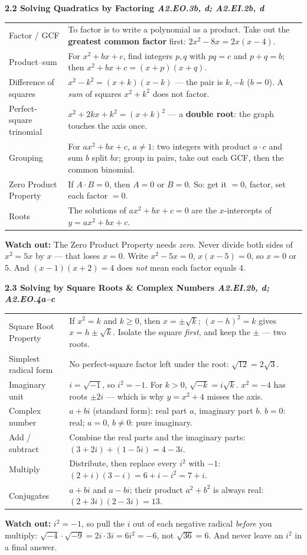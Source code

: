 \documentclass[10pt]{article}
\newcommand{\sghead}[2]{%
  \boxguard[10]%
  \vspace{4pt}\par\noindent
  \colorbox{forest}{\parbox{\dimexpr\linewidth-2\fboxsep}{%
    \small\color{white}\bfseries #1 \hfill \textmd{\itshape\scriptsize\color{forestmid} #2}}}%
  \vspace{2pt}\par}
\newcommand{\sgwatch}[1]{%
  \vspace{1pt}\par\noindent
  \colorbox{redbg}{\parbox{\dimexpr\linewidth-2\fboxsep}{%
    \footnotesize\textbf{\textcolor{redacc}{Watch out:}} #1}}%
  \vspace{1pt}\par}
\newcommand{\sgtabsetup}{\renewcommand{\arraystretch}{1.06}\footnotesize}
\begin{document}
\sghead{2.2 \quad Solving Quadratics by Factoring}{A2.EO.3b, d; A2.EI.2b, d}
{\sgtabsetup
\begin{tabularx}{\linewidth}{@{} G X @{}}
Factor / GCF & To factor is to write a polynomial as a product. Take out the \textbf{greatest
  common factor} first: $2x^2-8x=2x(x-4)$. \\
Product--sum & For $x^2+bx+c$, find integers $p,q$ with $pq=c$ and $p+q=b$; then
  $x^2+bx+c=(x+p)(x+q)$. \\
Difference of squares & $x^2-k^2=(x+k)(x-k)$ --- the pair is $k,-k$ ($b=0$). A \emph{sum} of
  squares $x^2+k^2$ does not factor. \\
Perfect-square trinomial & $x^2+2kx+k^2=(x+k)^2$ --- a \textbf{double root}: the graph touches
  the axis once. \\
Grouping & For $ax^2+bx+c$, $a\ne1$: two integers with product $a\cdot c$ and sum $b$ split $bx$;
  group in pairs, take out each GCF, then the common binomial. \\
Zero Product Property & If $A\cdot B=0$, then $A=0$ or $B=0$. So: get it $=0$, factor, set each
  factor $=0$. \\
Roots & The solutions of $ax^2+bx+c=0$ are the $x$-intercepts of $y=ax^2+bx+c$. \\
\end{tabularx}}
\sgwatch{The Zero Product Property needs \emph{zero}. Never divide both sides of $x^2=5x$ by $x$
--- that loses $x=0$. Write $x^2-5x=0$, $x(x-5)=0$, so $x=0$ or $5$. And $(x-1)(x+2)=4$ does
\emph{not} mean each factor equals $4$.}

\sghead{2.3 \quad Solving by Square Roots \& Complex Numbers}{A2.EI.2b, d; A2.EO.4a--c}
{\sgtabsetup
\begin{tabularx}{\linewidth}{@{} G X @{}}
Square Root Property & If $x^2=k$ and $k\ge0$, then $x=\pm\sqrt{k}$; $(x-h)^2=k$ gives
  $x=h\pm\sqrt{k}$. Isolate the square \emph{first}, and keep the $\pm$ --- two roots. \\
Simplest radical form & No perfect-square factor left under the root: $\sqrt{12}=2\sqrt3$. \\
Imaginary unit & $i=\sqrt{-1}$, so $i^2=-1$. For $k>0$, $\sqrt{-k}=i\sqrt{k}$. $x^2=-4$ has
  roots $\pm2i$ --- which is why $y=x^2+4$ misses the axis. \\
Complex number & $a+bi$ (standard form): real part $a$, imaginary part $b$. $b=0$: real;
  $a=0$, $b\ne0$: pure imaginary. \\
Add / subtract & Combine the real parts and the imaginary parts: $(3+2i)+(1-5i)=4-3i$. \\
Multiply & Distribute, then replace every $i^2$ with $-1$: $(2+i)(3-i)=6+i-i^2=7+i$. \\
Conjugates & $a+bi$ and $a-bi$; their product $a^2+b^2$ is always real: $(2+3i)(2-3i)=13$. \\
\end{tabularx}}
\sgwatch{$i^2=-1$, so pull the $i$ out of each negative radical \emph{before} you multiply:
$\sqrt{-4}\cdot\sqrt{-9}=2i\cdot3i=6i^2=-6$, not $\sqrt{36}=6$. And never leave an $i^2$ in a
final answer.}
\end{document}
